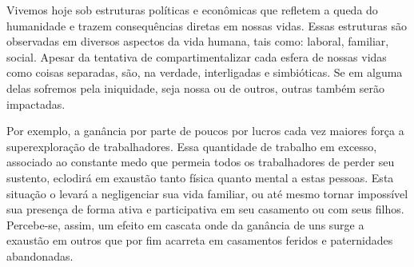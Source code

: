 \documentclass[
    article,            %
	12pt,				%
	oneside,			%
	a4paper,			%
	chapter=TITLE,		%
	section=TITLE,		%
	english,			%
	french,				%
	spanish,			%
	brazil				%
	]{abntex2}
\begin{document}



\imprimircapa

\imprimirfolhaderosto


\textual
\pagestyle{simple}




Vivemos hoje sob estruturas políticas e econômicas que refletem a queda do humanidade e trazem consequências diretas em nossas vidas. Essas estruturas são observadas em diversos aspectos da vida humana, tais como: laboral, familiar, social. Apesar da tentativa de compartimentalizar cada esfera de nossas vidas como coisas separadas, são, na verdade, interligadas e simbióticas. Se em alguma delas sofremos pela iniquidade, seja nossa ou de outros, outras também serão impactadas.

Por exemplo, a ganância por parte de poucos por lucros cada vez maiores força a superexploração de trabalhadores. Essa quantidade de trabalho em excesso, associado ao constante medo que permeia todos os trabalhadores de perder seu sustento, eclodirá em exaustão tanto física quanto mental a estas pessoas. Esta situação o levará a negligenciar sua vida familiar, ou até mesmo tornar impossível sua presença de forma ativa e participativa em seu casamento ou com seus filhos. Percebe-se, assim, um efeito em cascata onde da ganância de uns surge a exaustão em outros que por fim acarreta em casamentos feridos e paternidades abandonadas.
\end{document}
